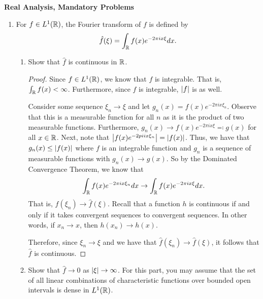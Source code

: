 \documentclass[12pt]{article}
\theoremstyle{plain}
\begin{document}
\newpage
\newpage
\begin{center}
    {\bf\Large Real Analysis, Mandatory Problems}
\end{center}
\begin{enumerate}
    \item For $f \in L^1(\mathbb{R})$, the Fourier transform of $f$ is defined by
    \[
        \hat{f}(\xi) = \int_{\mathbb{R}}{f(x)e^{-2\pi ix\xi}dx}.
    \]

    \begin{enumerate}
    \item Show that $\hat{f}$ is continuous in $\mathbb{R}$.
    
        \begin{proof}
            Since $f\in L^1(\mathbb{R})$, we know that $f$ is integrable.
            That is, $\int_{\mathbb{R}}{f(x)} < \infty$.
            Furthermore, since $f$ is integrable, $\left| f \right|$ is as well.
            
            Consider some sequence $\xi_n \rightarrow \xi$ and let $g_n(x) = f(x)e^{-2\pi ix\xi_n}$.
            Observe that this is a measurable function for all $n$ as it is the product of two measurable functions.
            Furthermore, $g_n(x) \rightarrow f(x)e^{-2\pi ix\xi} \eqqcolon g(x)$ for all $x\in\mathbb{R}$.
            Next, note that $\left| f(x)e^{-2pi ix\xi_n} \right| = \left| f(x) \right|$.
            Thus, we have that $g_n(x) \leq \left| f(x) \right|$ where $f$ is an integrable function and $g_n$ is a sequence of measurable functions with $g_n(x)\rightarrow g(x)$.
            So by the Dominated Convergence Theorem, we know that
            \[
                \int_{\mathbb{R}}{f(x)e^{-2\pi ix\xi_n}dx} \rightarrow \int_{\mathbb{R}}{f(x)e^{-2\pi ix\xi}dx}.
            \]
            That is, $\hat{f}(\xi_n) \rightarrow \hat{f}(\xi)$.
            Recall that a function $h$ is continuous if and only if it takes convergent sequences to convergent sequences.
            In other words, if $x_n \rightarrow x$, then $h(x_n) \rightarrow h(x)$.

            Therefore, since $\xi_n \rightarrow \xi$ and we have that $\hat{f}(\xi_n) \rightarrow \hat{f}(\xi)$, it follows that $\hat{f}$ is continuous.
        \end{proof}

    \item Show that $\hat{f} \rightarrow 0$ as $\left| \xi \right| \rightarrow \infty$.
    For this part, you may assume that the set of all linear combinations of characteristic functions over bounded open intervals is dense in $L^1(\mathbb{R})$.
    \end{enumerate}
\end{enumerate}
\end{document}

